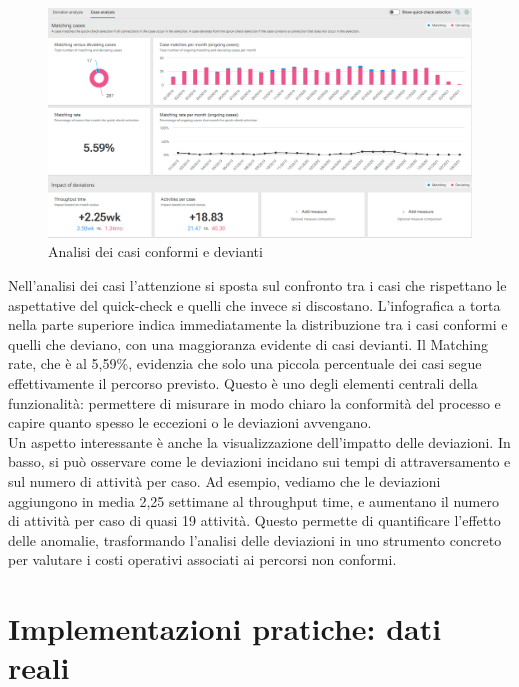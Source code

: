 \documentclass{article}
\begin{document}
\begin{figure}[H]
    \centering
    \includegraphics[width=\textwidth]{imgARIS/Simulazione/QuickCheck2Simulazione.png}
    \caption{Analisi dei casi conformi e devianti}
    \label{fig:quick-check-2}
\end{figure}
Nell'analisi dei casi l’attenzione si sposta sul confronto tra i casi che rispettano le aspettative del quick-check e quelli che invece si discostano. L'infografica a torta nella parte superiore indica immediatamente la distribuzione tra i casi conformi e quelli che deviano, con una maggioranza evidente di casi devianti. Il Matching rate, che è al 5,59\%, evidenzia che solo una piccola percentuale dei casi segue effettivamente il percorso previsto. Questo è uno degli elementi centrali della funzionalità: permettere di misurare in modo chiaro la conformità del processo e capire quanto spesso le eccezioni o le deviazioni avvengano.\\
Un aspetto interessante è anche la visualizzazione dell'impatto delle deviazioni. In basso, si può osservare come le deviazioni incidano sui tempi di attraversamento e sul numero di attività per caso. Ad esempio, vediamo che le deviazioni aggiungono in media 2,25 settimane al throughput time, e aumentano il numero di attività per caso di quasi 19 attività. Questo permette di quantificare l'effetto delle anomalie, trasformando l'analisi delle deviazioni in uno strumento concreto per valutare i costi operativi associati ai percorsi non conformi.

\section{Implementazioni pratiche: dati reali}
\end{document}
